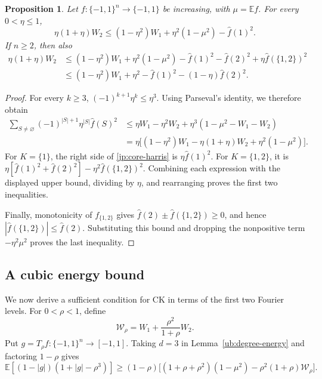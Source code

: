 \documentclass[11pt,letterpaper]{amsart}
\newcommand{\E}{\mathbb E}
\newcommand{\1}{\mathbf 1}
\newtheorem{proposition}[theorem]{Proposition}
\numberwithin{equation}{section}
\begin{document}
\begin{proposition}
Let $f:\{-1,1\}^n\to\{-1,1\}$ be increasing, with $\mu=\E f$.
For every $0<\eta\le1$,
\[
 \eta(1+\eta)W_2
 \le(1-\eta^2)W_1+\eta^2(1-\mu^2)-\widehat f(1)^2.
\]
If $n\ge2$, then also
\begin{align*}
 \eta(1+\eta)W_2
 &\le(1-\eta^2)W_1+\eta^2(1-\mu^2)
     -\widehat f(1)^2-\widehat f(2)^2
     +\eta\widehat f(\{1,2\})^2\\
 &\le(1-\eta^2)W_1+\eta^2
     -\widehat f(1)^2-(1-\eta)\widehat f(2)^2.
\end{align*}
\end{proposition}

\begin{proof}
For every $k\ge3$,
$(-1)^{k+1}\eta^k\le\eta^3$.
Using Parseval's identity, we therefore obtain
\[
 \begin{aligned}
 \sum_{S\ne\varnothing}
   (-1)^{|S|+1}\eta^{|S|}\widehat f(S)^2
 &\le \eta W_1-\eta^2W_2
       +\eta^3(1-\mu^2-W_1-W_2)\\
 &=\eta\bigl[(1-\eta^2)W_1
       -\eta(1+\eta)W_2+\eta^2(1-\mu^2)\bigr].
 \end{aligned}
\]
For $K=\{1\}$, the right side of \eqref{jp:core-harris}
is $\eta\widehat f(1)^2$.
For $K=\{1,2\}$, it is
$\eta[\widehat f(1)^2+\widehat f(2)^2]
-\eta^2\widehat f(\{1,2\})^2$.
Combining each expression with the displayed upper bound,
dividing by $\eta$, and rearranging proves the first two inequalities.

Finally, monotonicity of $f_{\{1,2\}}$ gives
$\widehat f(2)\pm\widehat f(\{1,2\})\ge0$,
and hence $|\widehat f(\{1,2\})|\le\widehat f(2)$.
Substituting this bound and dropping the nonpositive term
$-\eta^2\mu^2$ proves the last inequality.
\end{proof}

\subsection{A cubic energy bound}

We now derive a sufficient condition for CK in terms of the first
two Fourier levels. For $0<\rho<1$, define
\begin{equation}\label{eq:cubic-weight}
 \mathcal W_\rho=W_1+\frac{\rho^2}{1+\rho}W_2.
\end{equation}
Put $g=T_\rho f:\{-1,1\}^n\to[-1,1]$.
Taking $d=3$ in Lemma~\ref{ub:degree-energy} and factoring
$1-\rho$ gives
\begin{equation}\label{ub:cubic-product}
 \E[(1-|g|)(1+|g|-\rho^3)]
 \ge(1-\rho)\bigl[(1+\rho+\rho^2)(1-\mu^2)-\rho^2(1+\rho)\mathcal W_\rho\bigr].
\end{equation}
\end{document}
